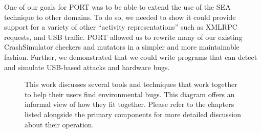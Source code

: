 One of our goals for PORT was to be able to extend the use of the SEA technique to other domains. To do so, we needed to show it could provide support for a variety of other ``activity representations'' such as XMLRPC requests, and USB traffic.
PORT allowed us to rewrite many of our existing CrashSimulator checkers and mutators in a simpler and more maintainable fashion.
Further, we demonstrated that we could write programs that can detect and simulate USB-based attacks and hardware bugs.


\begin{figure}[H]
  \center{}
  \caption[Overview of Components]{This work discusses several tools and techniques that work together to help their users find environmental bugs.  This diagram offers an informal view of how they fit together.  Please refer to the chapters listed alongside the primary components for more detailed discussion about their operation.}
  \label{fig:overview}
\end{figure}

